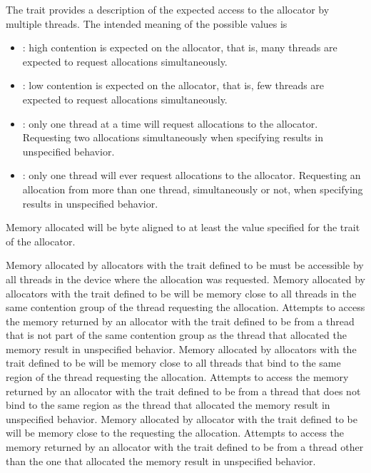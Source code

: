 The {} trait provides a description of the expected access to the allocator by multiple threads. The intended meaning of the possible values is
\begin{itemize}
 \item {}: high contention is expected on the allocator, that is, many threads are expected to request allocations simultaneously.
 \item {}: low contention is expected on the allocator, that is, few threads are expected to request allocations simultaneously.
 \item {}: only one thread at a time will request allocations to the allocator. Requesting two allocations simultaneously when specifying  results in unspecified behavior.
 \item {}: only one thread will ever request allocations to the allocator. Requesting an allocation from more than one thread, simultaneously or not, when specifying  results in unspecified behavior.
\end{itemize}

Memory allocated will be byte aligned to at least the value specified for the {} trait of the allocator.

Memory allocated by allocators with the  trait defined to be  must be accessible by all threads in the device where the allocation was requested. Memory allocated by allocators with the  trait defined to be  will be memory close to all threads in the same contention group of the thread requesting the allocation. Attempts to access the memory returned by an allocator with the  trait defined to be  from a thread that is not part of the same contention group as the thread that allocated the memory result in unspecified behavior. Memory allocated by allocators with the  trait defined to be  will be memory close to all threads that bind to the same {} region of the thread requesting the allocation. Attempts to access the memory returned by  an allocator with the  trait defined to be  from a thread that does not bind to the same {} region as the thread that allocated the memory result in unspecified behavior. Memory allocated by allocator with the  trait defined to be  will be memory close to the {} requesting the allocation. Attempts to access the memory returned by an allocator with the  trait defined to be  from a thread other than the one that allocated the memory result in unspecified behavior.

